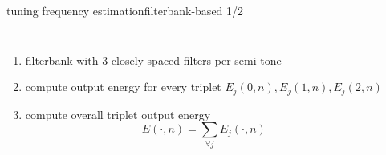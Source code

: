 	\begin{frame}{tuning frequency estimation}{filterbank-based 1/2}
    \vspace{-5mm}
        \begin{columns}
            \begin{enumerate}
                \item	filterbank with 3 closely spaced filters per semi-tone
                \item<2->	compute output energy for every triplet $E_j(0,n),E_j(1,n),E_j(2,n)$
                \item<3->	compute overall triplet output energy 
                    \begin{equation*}
                        E(\cdot,n)	= \sum\limits_{\forall j}{E_j(\cdot,n)}
                    \end{equation*}


\end{enumerate}
\end{columns}
\end{frame}

